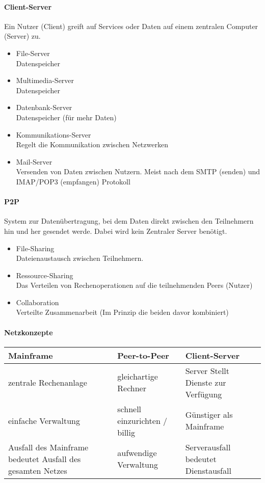 \documentclass[twocolumn]{article}
\begin{document}
\paragraph{Client-Server}
	Ein Nutzer (Client) greift auf Services oder Daten auf einem zentralen Computer (Server) zu. 
	\begin{itemize}
		\item File-Server \\  Datenspeicher
		\item Multimedia-Server \\ Datenspeicher
		\item Datenbank-Server \\ Datenspeicher (für mehr Daten) 
		\item Kommunikations-Server \\ Regelt die Kommunikation zwischen Netzwerken
		\item Mail-Server \\ Versenden von Daten zwischen Nutzern. Meist nach dem SMTP (senden) und IMAP/POP3 (empfangen) Protokoll     
	\end{itemize}

\paragraph{P2P}
	System zur Datenübertragung, bei dem Daten direkt zwischen den Teilnehmern hin und her gesendet werde. Dabei wird kein Zentraler Server benötigt.
	\begin{itemize}
		\item File-Sharing \\
			Dateienaustausch zwischen Teilnehmern.
		\item Ressource-Sharing \\
			Das Verteilen von Rechenoperationen auf die teilnehmenden Peers (Nutzer)
		\item Collaboration \\
			Verteilte Zusammenarbeit (Im Prinzip die beiden davor kombiniert)
	\end{itemize}

\paragraph{Netzkonzepte\\}
	\begin{tabular}{L{25mm}|L{25mm}|L{25mm}}
		Mainframe \footnotemark  & Peer-to-Peer & Client-Server \\ \hline
		 zentrale Rechenanlage & gleichartige Rechner & Server Stellt Dienste zur Verfügung \\ \hline
		  einfache Verwaltung & schnell einzurichten / billig  & Günstiger als Mainframe \\ \hline
		  Ausfall des Mainframe bedeutet Ausfall des gesamten Netzes & aufwendige Verwaltung & Serverausfall bedeutet Dienstausfall  \\
	\end{tabular}
\end{document}
